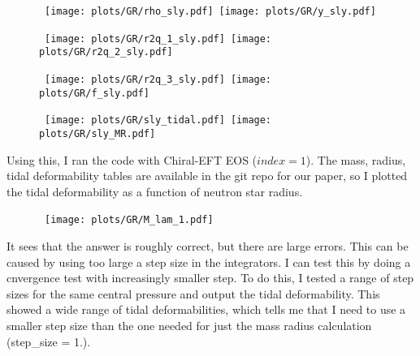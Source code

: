 \documentclass[11pt]{article}
\numberwithin{equation}{section}
\begin{document}
\begin{figure}
\begin{center}
\hbox{
\texttt{[image: plots/GR/rho\_sly.pdf]}
\texttt{[image: plots/GR/y\_sly.pdf]}}
\end{center}
\begin{center}
\hbox{
\texttt{[image: plots/GR/r2q\_1\_sly.pdf]}
\texttt{[image: plots/GR/r2q\_2\_sly.pdf]}}
\end{center}
\begin{center}
\hbox{
\texttt{[image: plots/GR/r2q\_3\_sly.pdf]}
\texttt{[image: plots/GR/f\_sly.pdf]}}
\end{center}
\end{figure}

\begin{figure}
\begin{center}
\hbox{
\texttt{[image: plots/GR/sly\_tidal.pdf]}
\texttt{[image: plots/GR/sly\_MR.pdf]}}
\end{center}
\end{figure}

Using this, I ran the code with Chiral-EFT EOS ($index=1$). The mass, radius, tidal deformability tables are available in the git repo for our paper, so I plotted the tidal deformability as a function of neutron star radius.

\begin{figure}
\begin{center}
\hbox{
\texttt{[image: plots/GR/M\_lam\_1.pdf]}}
\end{center}
\end{figure}

It sees that the answer is roughly correct, but there are large errors.  This can be caused by using too large a step size in the integrators.  I can test this by doing a cnvergence test with increasingly smaller step.  To do this, I tested a range of step sizes for the same central pressure and output the tidal deformability.  This showed a wide range of tidal deformabilities, which tells me that I need to use a smaller step size than the one needed for just the mass radius calculation (step\_size = 1.).  
\end{document}
